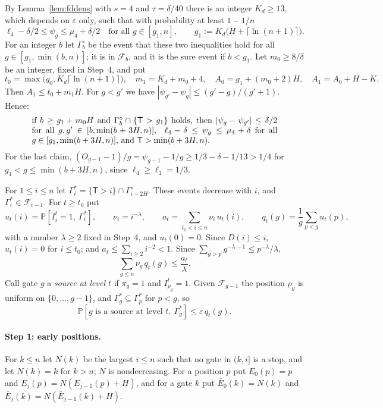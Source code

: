 \documentclass[11pt]{amsart}
\theoremstyle{definition}
\theoremstyle{remark}
\newcommand{\eps}{\varepsilon}
\newcommand{\PP}{\mathbb{P}}
\newcommand{\cF}{\mathcal{F}}
\begin{document}
By Lemma~\ref{lem:fddens} with $s=4$ and $\tau=\delta/40$ there is an integer $K_d\ge13$, which
depends on $\eps$ only, such that with probability at least $1-1/n$
\[
\ell_4-\delta/2\le\psi_g\le\mu_4+\delta/2\quad\text{for all }g\in[g_1,n],\qquad g_1:=K_d\bigl(H+\lceil\ln(n+1)\rceil\bigr).
\]
For an integer $b$ let $\Gamma^\circ_b$ be the event that these two inequalities hold for all
$g\in[g_1,\min(b,n)]$; it is in $\cF_b$, and it is the sure event if $b<g_1$. Let $m_0\ge8/\delta$
be an integer, fixed in Step~4, and put
\[
t_0=\max\bigl(g_0,K_d\lceil\ln(n+1)\rceil\bigr),\quad m_1=K_d+m_0+4,\quad A_0=g_1+(m_0+2)H,\quad A_1=A_0+H-K .
\]
Then $A_1\le t_0+m_1H$. For $g<g'$ we have $|\psi_{g'}-\psi_g|\le(g'-g)/(g'+1)$. Hence:
\begin{equation}\label{eq:rowslate}
\begin{minipage}{0.86\linewidth}
if $b\ge g_1+m_0H$ and $\Gamma^\circ_b\cap\{\mathsf T>g_1\}$ holds, then
$|\psi_g-\psi_{g'}|\le\delta/2$ for all $g,g'\in[b,\min(b+3H,n)]$, $\ \ell_4-\delta\le\psi_g\le\mu_4+\delta$
for all $g\in[g_1,\min(b+3H,n)]$, and $\mathsf T>\min(b+3H,n)$.
\end{minipage}
\end{equation}
For the last claim, $(O_{g-1}-1)/g=\psi_{g-1}-1/g\ge1/3-\delta-1/13>1/4$ for $g_1<g\le\min(b+3H,n)$,
since $\ell_4\ge\ell_1=1/3$.

For $1\le i\le n$ let $\Gamma^*_i=\{\mathsf T>i\}\cap\Gamma^\circ_{i-2H}$. These events decrease
with $i$, and $\Gamma^*_i\in\cF_{i-1}$. For $t\ge t_0$ put
\[
u_t(i)=\PP[I^t_i=1,\ \Gamma^*_i],\qquad \nu_i=i^{-\lambda},\qquad a_t=\sum_{t_0<i\le n}\nu_i\,u_t(i),\qquad
q_t(g)=\frac1g\sum_{p<g}u_t(p),
\]
with a number $\lambda\ge2$ fixed in Step~4, and $u_t(0)=0$. Since $D(i)\le i$, $u_t(i)=0$ for $i\le t_0$; and
$a_t\le\sum_{i\ge2}i^{-2}<1$. Since $\sum_{g>p}g^{-\lambda-1}\le p^{-\lambda}/\lambda$,
\begin{equation}\label{eq:rowsq}
\sum_{g\le n}\nu_g\,q_t(g)\le\frac{a_t}{\lambda}.
\end{equation}
Call gate $g$ a \emph{source at level $t$} if $\pi_g=1$ and $I^t_{\rho_g}=1$. Given $\cF_{g-1}$
the position $\rho_g$ is uniform on $\{0,\dots,g-1\}$, and $\Gamma^*_g\subseteq\Gamma^*_p$ for
$p<g$, so
\begin{equation}\label{eq:rowssource}
\PP[g\text{ is a source at level }t,\ \Gamma^*_g]\le\eps\,q_t(g).
\end{equation}

\paragraph{Step 1: early positions.}
For $k\le n$ let $N(k)$ be the largest $i\le n$ such that no gate in $(k,i]$ is a stop, and let
$N(k)=k$ for $k>n$; $N$ is nondecreasing. For a position $p$ put $E_0(p)=p$ and
$E_j(p)=N(E_{j-1}(p)+H)$, and for a gate $k$ put $\bar E_0(k)=N(k)$ and
$\bar E_j(k)=N(\bar E_{j-1}(k)+H)$.
\end{document}
